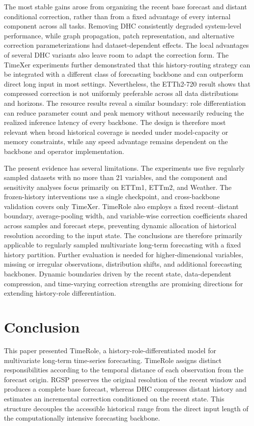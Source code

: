 The most stable gains arose from organizing the recent base forecast and distant conditional correction, rather than from a fixed advantage of every internal component across all tasks. Removing DHC consistently degraded system-level performance, while graph propagation, patch representation, and alternative correction parameterizations had dataset-dependent effects. The local advantages of several DHC variants also leave room to adapt the correction form. The TimeXer experiments further demonstrated that this history-routing strategy can be integrated with a different class of forecasting backbone and can outperform direct long input in most settings. Nevertheless, the ETTh2-720 result shows that compressed correction is not uniformly preferable across all data distributions and horizons. The resource results reveal a similar boundary: role differentiation can reduce parameter count and peak memory without necessarily reducing the realized inference latency of every backbone. The design is therefore most relevant when broad historical coverage is needed under model-capacity or memory constraints, while any speed advantage remains dependent on the backbone and operator implementation.

The present evidence has several limitations. The experiments use five regularly sampled datasets with no more than 21 variables, and the component and sensitivity analyses focus primarily on ETTm1, ETTm2, and Weather. The frozen-history interventions use a single checkpoint, and cross-backbone validation covers only TimeXer. TimeRole also employs a fixed recent--distant boundary, average-pooling width, and variable-wise correction coefficients shared across samples and forecast steps, preventing dynamic allocation of historical resolution according to the input state. The conclusions are therefore primarily applicable to regularly sampled multivariate long-term forecasting with a fixed history partition. Further evaluation is needed for higher-dimensional variables, missing or irregular observations, distribution shifts, and additional forecasting backbones. Dynamic boundaries driven by the recent state, data-dependent compression, and time-varying correction strengths are promising directions for extending history-role differentiation.

\section{Conclusion}

This paper presented TimeRole, a history-role-differentiated model for multivariate long-term time-series forecasting. TimeRole assigns distinct responsibilities according to the temporal distance of each observation from the forecast origin. RGSP preserves the original resolution of the recent window and produces a complete base forecast, whereas DHC compresses distant history and estimates an incremental correction conditioned on the recent state. This structure decouples the accessible historical range from the direct input length of the computationally intensive forecasting backbone.

